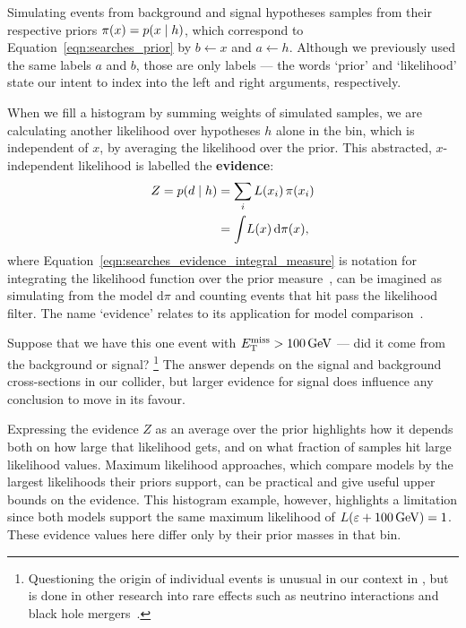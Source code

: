 Simulating events from background and signal hypotheses samples from their
respective priors $\pi(x) = \prob{x}{h}$, which
correspond to Equation~\ref{eqn:searches_prior} by
$b \leftarrow x$ and $a \leftarrow h$.
Although we previously used the same labels $a$ and $b$, those are only
labels --- the words `prior' and `likelihood' state our intent to index into
the left and right arguments, respectively.

When we fill a histogram by summing weights of simulated samples, we are
calculating another likelihood over hypotheses $h$ alone in the bin,
which is independent of $x$, by averaging the likelihood over the prior.
This abstracted, $x$-independent likelihood is labelled the \textbf{evidence}:
\begin{align}
Z
= \prob{d}{h} &= \sum_i L(x_i) \,\pi(x_i)
\label{eqn:searches_evidence_integral_sum}
\\
&= \int\! L(x) \,\mathrm{d}\pi(x),
\label{eqn:searches_evidence_integral_measure}
\end{align}
where Equation~\ref{eqn:searches_evidence_integral_measure} is notation for
integrating the likelihood function over the prior measure~\cite{
billingsley2008probability,
skilling2010foundations
},
can be imagined as simulating from the model $\mathrm{d}\pi$ and
counting events that hit pass the likelihood filter.
The name `evidence' relates to its application for model
comparison~\cite{mackay2003information}.


Suppose that we have this one event with $\met > 100\,\eV[G]$ ---
did it come from the background or signal?%
\footnote{%
Questioning the origin of individual events is unusual in our context in
\atlas, but is done in other research into rare effects such as neutrino
interactions and black hole mergers~\cite{
opera2010event,
icecube2020event,
Abbott2021event
}.%
}
The answer depends on the signal and background cross-sections in our collider,
but larger evidence for signal does influence any conclusion to move in its
favour.

Expressing the evidence $Z$ as an average over the prior highlights how it
depends both on how large that likelihood gets,
and on what fraction of samples hit large likelihood values.
Maximum likelihood approaches,
which compare models by the largest likelihoods their priors support,
can be practical and give useful upper bounds on the evidence.
This histogram example, however, highlights a limitation since both models
support the same maximum likelihood of
$L(\varepsilon + 100\,\eV[G]) = 1$.
These evidence values here differ only by their prior masses in that bin.

